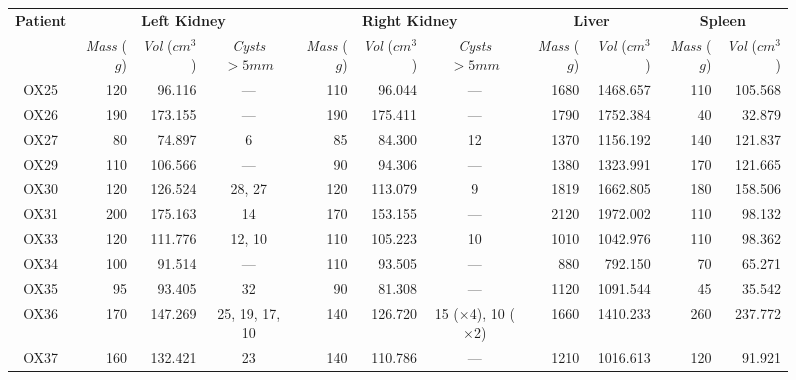 \begin{landscape}
\begin{figure}[p]
\footnotesize
\begin{center}
\begin{tabular}{c|rrc|rrc|rr|rr}
\textbf{Patient} & \multicolumn{3}{|c|}{\textbf{Left Kidney}} & \multicolumn{3}{|c|}{\textbf{Right Kidney}} & \multicolumn{2}{|c|}{\textbf{Liver}} & \multicolumn{2}{|c}{\textbf{Spleen}} \\
& \emph{Mass} ($g$) & \emph{Vol} ($\mathit{cm}^3$) & \emph{Cysts} $> 5\mathit{mm}$ & \emph{Mass} ($g$) & \emph{Vol} ($\mathit{cm}^3$) & \emph{Cysts} $> 5\mathit{mm}$ & \emph{Mass} ($g$) & \emph{Vol} ($\mathit{cm}^3$) & \emph{Mass} ($g$) & \emph{Vol} ($\mathit{cm}^3$) \\
\hline
\hline
OX25 & 120 &  96.116 &            --- & 110 &  96.044 &                            --- & 1680 & 1468.657 & 110 & 105.568 \\
OX26 & 190 & 173.155 &            --- & 190 & 175.411 &                            --- & 1790 & 1752.384 &  40 &  32.879 \\
OX27 &  80 &  74.897 &              6 &  85 &  84.300 &                             12 & 1370 & 1156.192 & 140 & 121.837 \\
OX29 & 110 & 106.566 &            --- &  90 &  94.306 &                            --- & 1380 & 1323.991 & 170 & 121.665 \\
OX30 & 120 & 126.524 &         28, 27 & 120 & 113.079 &                              9 & 1819 & 1662.805 & 180 & 158.506 \\
OX31 & 200 & 175.163 &             14 & 170 & 153.155 &                            --- & 2120 & 1972.002 & 110 &  98.132 \\
OX33 & 120 & 111.776 &         12, 10 & 110 & 105.223 &                             10 & 1010 & 1042.976 & 110 &  98.362 \\
OX34 & 100 &  91.514 &            --- & 110 &  93.505 &                            --- &  880 &  792.150 &  70 &  65.271 \\
OX35 &  95 &  93.405 &             32 &  90 &  81.308 &                            --- & 1120 & 1091.544 &  45 &  35.542 \\
OX36 & 170 & 147.269 & 25, 19, 17, 10 & 140 & 126.720 & 15 ($\times$4), 10 ($\times$2) & 1660 & 1410.233 & 260 & 237.772 \\
OX37 & 160 & 132.421 &             23 & 140 & 110.786 &                            --- & 1210 & 1016.613 & 120 &  91.921 \\

\end{tabular}
\end{center}
\end{figure}
\end{landscape}
